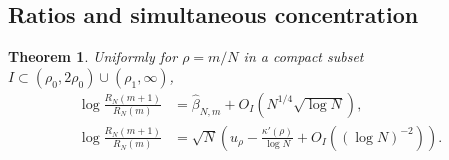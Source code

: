 \documentclass[11pt]{amsart}
\newtheorem{theorem}{Theorem}[section]
\theoremstyle{remark}
\begin{document}
\subsection{Ratios and simultaneous concentration}

\begin{theorem}
\label{thm:ratio}
Uniformly for \(\rho=m/N\) in a compact subset
\(I\subset(\rho_0,2\rho_0)\cup(\rho_1,\infty)\),
\begin{align}
\label{eq:ratio-at-saddle}
 \log\frac{R_N(m+1)}{R_N(m)}
 &=\widehat\beta_{N,m}+O_I(N^{1/4}\sqrt{\log N}),\\
\label{eq:ratio-two-term}
 \log\frac{R_N(m+1)}{R_N(m)}
 &=\sqrt N\left(u_\rho-\frac{\kappa'(\rho)}{\log N}
                            +O_I((\log N)^{-2})\right).
\end{align}
\end{theorem}
\end{document}
